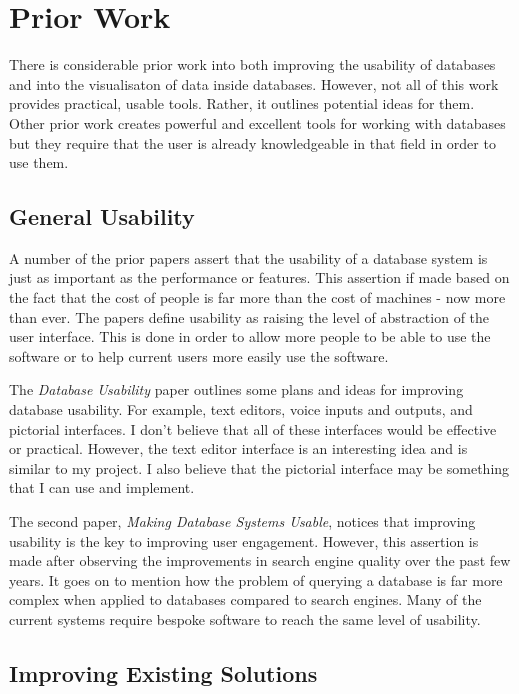 \chapter{Prior Work}

There is considerable prior work into both improving the usability of
databases and into the visualisaton of data inside databases. However, not all of this work provides practical, usable tools. Rather, it outlines potential ideas for them. Other prior work creates powerful and excellent tools for working with databases but they require that the user is already knowledgeable in that field in order to use them.

\section{General Usability}

A number of the prior papers\cite{Date, Jagadish2007} assert that the usability
of a database system is just as important as the performance or features. This
assertion if made based on the fact that the cost of people is far more than
the cost of machines - now more than ever. The papers define usability as
raising the level of abstraction of the user interface. This is done in order
to allow more people to be able to use the software or to help current users
more easily use the software.

The \emph{Database Usability} paper\cite{Date} outlines some plans and ideas
for improving database usability. For example, text editors, voice inputs and
outputs, and pictorial interfaces. I don't believe that all of these interfaces
would be effective or practical. However, the text editor interface is an
interesting idea and is similar to my project. I also believe that the
pictorial interface may be something that I can use and implement.

The second paper, \emph{Making Database Systems Usable}, notices that improving
usability is the key to improving user engagement. However, this assertion is
made after observing the improvements in search engine quality over the past
few years. It goes on to mention how the problem of querying a database is far
more complex when applied to databases compared to search engines. Many of the
current systems require bespoke software to reach the same level of usability.

\section{Improving Existing Solutions}

